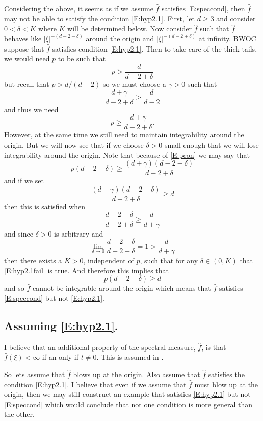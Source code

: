 \documentclass{article}
\numberwithin{equation}{section}
\begin{document}
Considering the above, it seems as if we assume $\hat{f}$ satisfies \eqref{E:speccond}, then $\hat{f}$ may not be able to satisfy the condition \eqref{E:hyp2.1}. First, let $d \ge 3$ and consider $0 < \delta < K$ where $K$ will be determined below. Now consider $\hat{f}$ such that $\hat{f}$ behaves like $|\xi|^{-(d-2-\delta)}$ around the origin and $|\xi|^{-(d-2+\delta)}$ at infinity. BWOC suppose that $\hat{f}$ satisfies condition \eqref{E:hyp2.1}. Then to take care of the thick tails, we would need $p$ to be such that
	\begin{equation}
		p > \frac{d}{d-2+\delta}
	\end{equation}
but recall that $p > d/(d-2)$ so we must choose a $\gamma >0$ such that
	\[
		\frac{d+\gamma}{d-2+\delta} > \frac{d}{d-2}
	\]
and thus we need
	\begin{equation}\label{E:pcon}
		p \ge \frac{d+\gamma}{d-2+\delta}.
	\end{equation}
However, at the same time we still need to maintain integrability around the origin. But we will now see that if we choose $\delta>0$ small enough that we will lose integrability around the origin. Note that because of \eqref{E:pcon} we may say that
	\[
		p(d-2-\delta) \ge \frac{(d+\gamma)(d-2-\delta)}{d-2+\delta}
	\]
and if we set
	\[
		\frac{(d+\gamma)(d-2-\delta)}{d-2 + \delta} \ge d
	\]
then this is satisfied when
	\begin{equation}\label{E:hyp2.1fail}
		\frac{d-2-\delta}{d-2 + \delta} \ge \frac{d}{d+\gamma}
	\end{equation}
and since $\delta>0$ is arbitrary and
	\[
		\lim_{\delta \to 0} \frac{d-2-\delta}{d-2 + \delta} = 1 > \frac{d}{d + \gamma}
	\]
then there exists a $K>0$, independent of $p$, such that for any $\delta \in (0,K)$ that \eqref{E:hyp2.1fail} is true. And therefore this implies that
	\[
			p(d-2-\delta) \ge d
	\]
and so $\hat{f}$ cannot be integrable around the origin which means that $\hat{f}$ satisfies \eqref{E:speccond} but not \eqref{E:hyp2.1}.

\subsection{Assuming \eqref{E:hyp2.1}.}

I believe that an additional property of the spectral measure, $\hat{f}$, is that $\hat{f}(\xi) < \infty$ if an only if $t \not= 0$. This is assumed in \cite{BC16}.

So lets assume that $\hat{f}$ blows up at the origin. Also assume that $\hat{f}$ satisfies the condition \eqref{E:hyp2.1}. I believe that even if we assume that $\hat{f}$ must blow up at the origin, then we may still construct an example that satisfies \eqref{E:hyp2.1} but not \eqref{E:speccond} which would conclude that not one condition is more general than the other.
\end{document}
